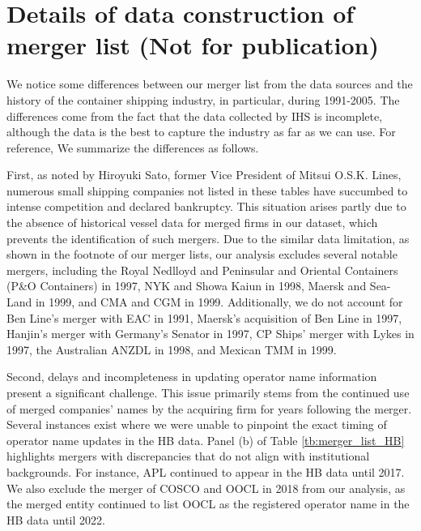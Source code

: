 \documentclass[10pt]{article}
\begin{document}



\newpage
\appendix
\section{Details of data construction of merger list (Not for publication)}\label{sec:details_of_data_construction}

We notice some differences between our merger list from the data sources and the history of the container shipping industry, in particular, during 1991-2005. 
The differences come from the fact that the data collected by IHS is incomplete, although the data is the best to capture the industry as far as we can use. For reference, We summarize the differences as follows. 

First, as noted by Hiroyuki Sato, former Vice President of Mitsui O.S.K. Lines, numerous small shipping companies not listed in these tables have succumbed to intense competition and declared bankruptcy. This situation arises partly due to the absence of historical vessel data for merged firms in our dataset, which prevents the identification of such mergers. Due to the similar data limitation, as shown in the footnote of our merger lists, our analysis excludes several notable mergers, including the Royal Nedlloyd and Peninsular and Oriental Containers (P\&O Containers) in 1997, NYK and Showa Kaiun in 1998, Maersk and Sea-Land in 1999, and CMA and CGM in 1999. Additionally, we do not account for Ben Line's merger with EAC in 1991, Maersk's acquisition of Ben Line in 1997, Hanjin's merger with Germany's Senator in 1997, CP Ships' merger with Lykes in 1997, the Australian ANZDL in 1998, and Mexican TMM in 1999.

Second, delays and incompleteness in updating operator name information present a significant challenge. This issue primarily stems from the continued use of merged companies' names by the acquiring firm for years following the merger. Several instances exist where we were unable to pinpoint the exact timing of operator name updates in the HB data. Panel (b) of Table \ref{tb:merger_list_HB} highlights mergers with discrepancies that do not align with institutional backgrounds. For instance, APL continued to appear in the HB data until 2017. We also exclude the merger of COSCO and OOCL in 2018 from our analysis, as the merged entity continued to list OOCL as the registered operator name in the HB data until 2022.
\end{document}
